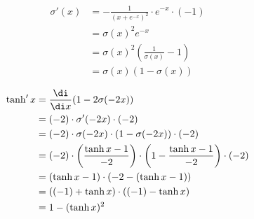 \begin{align*}
\sigma'(x) &= - \frac{1}{(x + e^{-x})^2} \cdot e^{-x} \cdot (-1) \\
 &= \sigma(x)^2 e^{-x} \\
 &= \sigma(x)^2 \left(\frac{1}{\sigma(x)} - 1\right) \\
 &= \sigma(x) (1 - \sigma(x))
\end{align*}

\begin{align*}
\tanh'{x} &= \frac{\di}{\di x} (1 - 2 \sigma(-2x)) \\
 &= (-2) \cdot \sigma'(-2x) \cdot (-2) \\
 &= (-2) \cdot \sigma(-2x) \cdot (1 - \sigma(-2x)) \cdot (-2) \\
 &= (-2) \cdot \left(\frac{\tanh{x}-1}{-2}\right) \cdot \left(1 - \frac{\tanh{x}-1}{-2}\right) \cdot (-2) \\
 &= (\tanh{x}-1) \cdot (-2 - (\tanh{x}-1)) \\
 &= ((-1) + \tanh{x}) \cdot ((-1) - \tanh{x}) \\
 &= 1 - (\tanh{x})^2
\end{align*}

